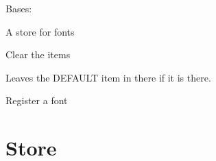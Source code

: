 \documentclass[letterpaper,10pt,english]{sphinxmanual}
\begin{document}
\begin{fulllineitems}
\label{visual:serge.visual.FontStore}
Bases: {\hyperref[common:serge.registry.GeneralStore]{}}

A store for fonts

\begin{fulllineitems}
\label{visual:serge.visual.FontStore.clearItems}
Clear the items

Leaves the DEFAULT item in there if it is there.

\end{fulllineitems}


\begin{fulllineitems}
\label{visual:serge.visual.FontStore.registerItem}
Register a font

\end{fulllineitems}


\end{fulllineitems}



\section{Store}
\label{visual:store}
\end{document}

